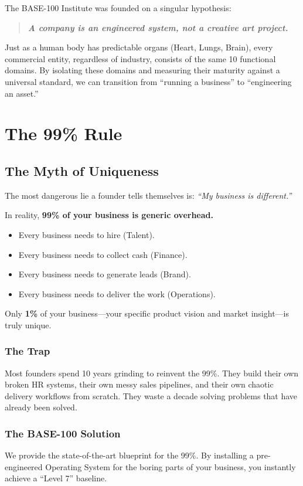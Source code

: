 \documentclass[11pt, a4paper, oneside]{report}
\begin{document}
The BASE-100 Institute was founded on a singular hypothesis:
\begin{quote}
    \itshape \textbf{A company is an engineered system, not a creative art project.}
\end{quote}

Just as a human body has predictable organs (Heart, Lungs, Brain), every commercial entity, regardless of industry, consists of the same 10 functional domains. By isolating these domains and measuring their maturity against a universal standard, we can transition from ``running a business'' to ``engineering an asset.''

\chapter{The 99\% Rule}
\section*{The Myth of Uniqueness}

The most dangerous lie a founder tells themselves is: \textit{``My business is different.''}

In reality, \textbf{99\% of your business is generic overhead.}
\begin{itemize}
    \item Every business needs to hire (Talent).
    \item Every business needs to collect cash (Finance).
    \item Every business needs to generate leads (Brand).
    \item Every business needs to deliver the work (Operations).
\end{itemize}

Only \textbf{1\%} of your business---your specific product vision and market insight---is truly unique.

\subsection*{The Trap}
Most founders spend 10 years grinding to reinvent the 99\%. They build their own broken HR systems, their own messy sales pipelines, and their own chaotic delivery workflows from scratch. They waste a decade solving problems that have already been solved.

\subsection*{The BASE-100 Solution}
We provide the state-of-the-art blueprint for the 99\%. By installing a pre-engineered Operating System for the boring parts of your business, you instantly achieve a ``Level 7'' baseline.
\end{document}
